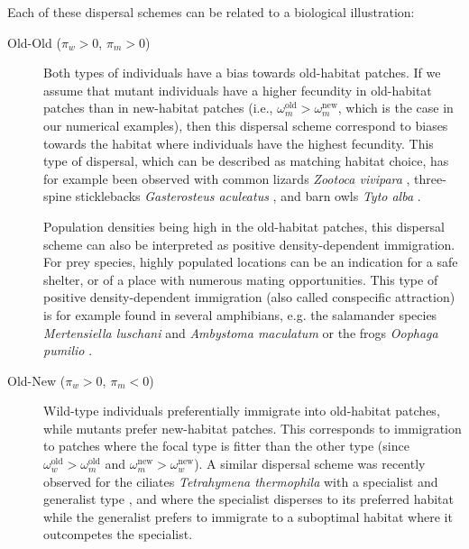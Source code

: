 \documentclass[a4paper,11pt]{article}
\begin{document}
Each of these dispersal schemes can be related to a biological illustration:

\begin{description}
	\item[Old-Old ($\pi_w>0$, $\pi_m>0$)] Both types of individuals have a bias towards old-habitat patches. If we assume that mutant individuals have a higher fecundity in old-habitat patches than in new-habitat patches (i.e., $\omega_m^{\text{old}} > \omega_m^{\text{new}}$, which is the case in our numerical examples), then this dispersal scheme correspond to biases towards the habitat where individuals have the highest fecundity. This type of dispersal, which can be described as matching habitat choice, has for example been observed with common lizards \textit{Zootoca vivipara} \citep{bestion_2015}, three-spine sticklebacks \textit{Gasterosteus aculeatus} \citep{bolnick_2009}, and barn owls \textit{Tyto alba} \citep{dreiss_2011}. 
	
	Population densities being high in the old-habitat patches, this dispersal scheme can also be interpreted as positive density-dependent immigration. For prey species, highly populated locations can be an indication for a safe shelter, or of a place with numerous mating opportunities. This type of positive density-dependent immigration (also called conspecific attraction) is for example found in several amphibians, e.g. the salamander species \textit{Mertensiella luschani} \citep{gautier_2006} and \textit{Ambystoma maculatum} \citep{greene_2016} or the frogs \textit{Oophaga pumilio} \citep{folt_2018}.
	
	\item[Old-New ($\pi_w>0$, $\pi_m<0$)] Wild-type individuals preferentially immigrate into old-habitat patches, while mutants prefer new-habitat patches. This corresponds to immigration to patches where the focal type is fitter than the other type (since $\omega_w^{\text{old}} >\omega_m^{\text{old}}$ and $\omega_m^{\text{new}} >\omega_w^{\text{new}}$). 
	A similar dispersal scheme was recently observed for the ciliates \textit{Tetrahymena thermophila} with a specialist and generalist type \citep{jacob_2018}, and where the specialist disperses to its preferred habitat while the generalist prefers to immigrate to a suboptimal habitat where it outcompetes the specialist. 
	

\end{description}
\end{document}
